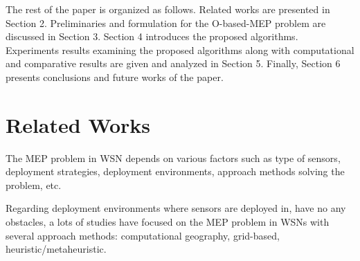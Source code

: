 \documentclass[final]{elsarticle}
\begin{document}
The rest of the paper is organized as follows. Related works are presented in Section 2. Preliminaries and formulation for the O-based-MEP problem are discussed in Section 3. Section 4 introduces the proposed algorithms. Experiments results examining the proposed algorithms along with computational and comparative results are given and analyzed in Section 5. Finally, Section 6 presents conclusions and future works of the paper.

\section{Related Works}
The MEP problem in WSN depends on various factors such as type of sensors, deployment strategies, deployment environments, approach methods solving the problem, etc. 

Regarding deployment environments where sensors are deployed in, have no any obstacles, a lots of studies have focused on the MEP problem in WSNs with several approach methods: computational geography, grid-based, heuristic/metaheuristic.
\end{document}
